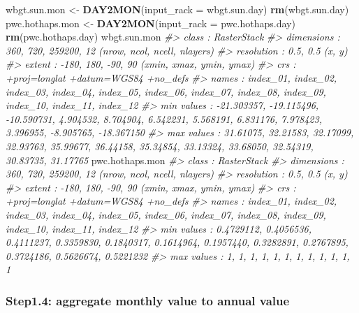 \documentclass[
]{article}
\newenvironment{Shaded}{\begin{snugshade}}{\end{snugshade}}
\newcommand{\AttributeTok}[1]{\textcolor[rgb]{0.13,0.29,0.53}{#1}}
\newcommand{\CommentTok}[1]{\textcolor[rgb]{0.56,0.35,0.01}{\textit{#1}}}
\newcommand{\FunctionTok}[1]{\textcolor[rgb]{0.13,0.29,0.53}{\textbf{#1}}}
\newcommand{\NormalTok}[1]{#1}
\newcommand{\OtherTok}[1]{\textcolor[rgb]{0.56,0.35,0.01}{#1}}
\begin{document}
\begin{Shaded}
\begin{Highlighting}[]
\NormalTok{wbgt.sun.mon }\OtherTok{\textless{}{-}} \FunctionTok{DAY2MON}\NormalTok{(}\AttributeTok{input\_rack =}\NormalTok{ wbgt.sun.day)}
\FunctionTok{rm}\NormalTok{(wbgt.sun.day)}
\NormalTok{pwc.hothaps.mon }\OtherTok{\textless{}{-}} \FunctionTok{DAY2MON}\NormalTok{(}\AttributeTok{input\_rack =}\NormalTok{ pwc.hothaps.day)}
\FunctionTok{rm}\NormalTok{(pwc.hothaps.day)}
\NormalTok{wbgt.sun.mon}
\CommentTok{\#\textgreater{} class      : RasterStack }
\CommentTok{\#\textgreater{} dimensions : 360, 720, 259200, 12  (nrow, ncol, ncell, nlayers)}
\CommentTok{\#\textgreater{} resolution : 0.5, 0.5  (x, y)}
\CommentTok{\#\textgreater{} extent     : {-}180, 180, {-}90, 90  (xmin, xmax, ymin, ymax)}
\CommentTok{\#\textgreater{} crs        : +proj=longlat +datum=WGS84 +no\_defs }
\CommentTok{\#\textgreater{} names      :   index\_01,   index\_02,   index\_03,   index\_04,   index\_05,   index\_06,   index\_07,   index\_08,   index\_09,   index\_10,   index\_11,   index\_12 }
\CommentTok{\#\textgreater{} min values : {-}21.303357, {-}19.115496, {-}10.590731,   4.904532,   8.704904,   6.542231,   5.568191,   6.831176,   7.978423,   3.396955,  {-}8.905765, {-}18.367150 }
\CommentTok{\#\textgreater{} max values :   31.61075,   32.21583,   32.17099,   32.93763,   35.99677,   36.44158,   35.34854,   33.13324,   33.68050,   32.54319,   30.83735,   31.17765}
\NormalTok{pwc.hothaps.mon}
\CommentTok{\#\textgreater{} class      : RasterStack }
\CommentTok{\#\textgreater{} dimensions : 360, 720, 259200, 12  (nrow, ncol, ncell, nlayers)}
\CommentTok{\#\textgreater{} resolution : 0.5, 0.5  (x, y)}
\CommentTok{\#\textgreater{} extent     : {-}180, 180, {-}90, 90  (xmin, xmax, ymin, ymax)}
\CommentTok{\#\textgreater{} crs        : +proj=longlat +datum=WGS84 +no\_defs }
\CommentTok{\#\textgreater{} names      :  index\_01,  index\_02,  index\_03,  index\_04,  index\_05,  index\_06,  index\_07,  index\_08,  index\_09,  index\_10,  index\_11,  index\_12 }
\CommentTok{\#\textgreater{} min values : 0.4729112, 0.4056536, 0.4111237, 0.3359830, 0.1840317, 0.1614964, 0.1957440, 0.3282891, 0.2767895, 0.3724186, 0.5626674, 0.5221232 }
\CommentTok{\#\textgreater{} max values :         1,         1,         1,         1,         1,         1,         1,         1,         1,         1,         1,         1}
\end{Highlighting}
\end{Shaded}

\subsubsection{Step1.4: aggregate monthly value to annual
value}\label{step1.4-aggregate-monthly-value-to-annual-value}
\end{document}
